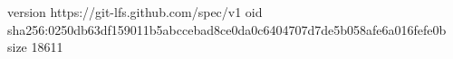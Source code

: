 version https://git-lfs.github.com/spec/v1
oid sha256:0250db63df159011b5abccebad8ce0da0c6404707d7de5b058afe6a016fefe0b
size 18611
